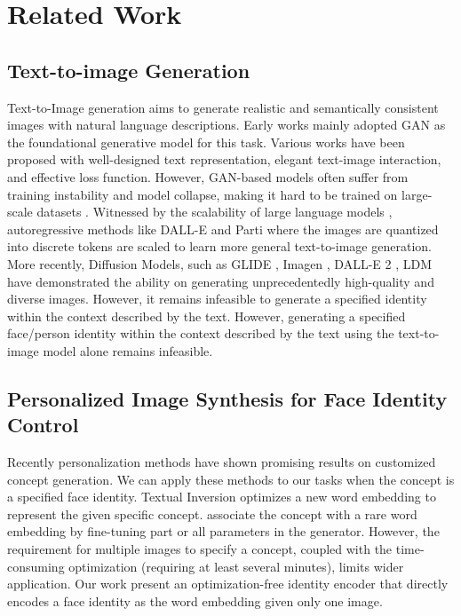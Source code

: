 \section{Related Work}\label{sec:related}
\vspace{-0.2cm}
\subsection{Text-to-image Generation}
Text-to-Image generation aims to generate realistic and semantically consistent images with natural language descriptions. Early works mainly adopted GAN \cite{goodfellow2014generative} as the foundational generative model for this task. Various works have been proposed \cite{zhang2021cross, zhu2019dm, xu2018attngan, zhang2017stackgan, zhang2018photographic, liang2020cpgan, cheng2020rifegan, ruan2021dae, tao2020df, li2019controllable, huang2022dse} with well-designed text representation, elegant text-image interaction, and effective loss function. However, GAN-based models often suffer from training instability and model collapse, making it hard to be trained on large-scale datasets \cite{brock2018large, kang2023scaling, schuhmann2021laion}. Witnessed by the scalability of large language models \cite{radford2019language}, autoregressive methods like DALL-E and Parti \cite{yu2022scaling, ramesh2021zero} where the images are quantized into discrete tokens are scaled to learn more general text-to-image generation.
More recently, Diffusion Models, such as GLIDE \cite{nichol2021glide}, Imagen \cite{saharia2022photorealistic},  DALL-E 2 \cite{ramesh2022hierarchical}, LDM \cite{rombach2022high}  have demonstrated the ability on generating unprecedentedly high-quality and diverse images.  However, it remains infeasible to generate a specified identity within the context described by the text. However, generating a specified face/person identity within the context described by the text using the text-to-image model alone remains infeasible.





\subsection{Personalized Image Synthesis for Face Identity Control}
Recently personalization methods \cite{gal2022image, ruiz2022dreambooth, kumari2022multi}  have shown promising results on customized concept generation. We can apply these methods to our tasks when the concept is a specified face identity. Textual Inversion \cite{gal2022image} optimizes a new word embedding to represent the given specific concept. \cite{ruiz2022dreambooth} \cite{kumari2022multi} associate the concept with a rare word embedding by fine-tuning part or all parameters in the generator.
However, the requirement for multiple images to specify a concept, coupled with the time-consuming optimization (requiring at least several minutes), limits wider application. Our work present an optimization-free identity encoder that directly encodes a face identity as the word embedding given only one image.

